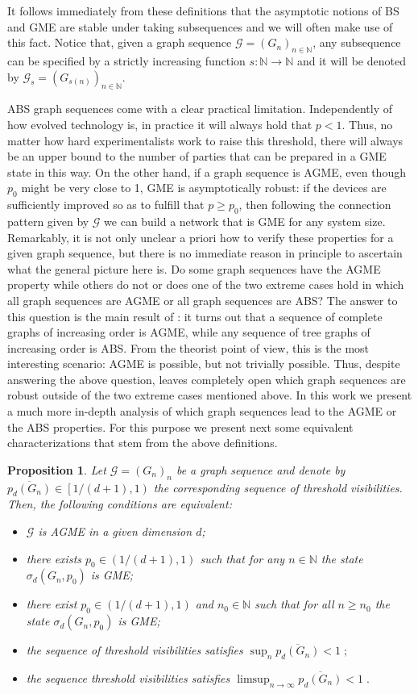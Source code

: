 \documentclass[a4paper,onecolumn,accepted=2024-12-14]{quantumarticle}
\newtheorem{proposition}[theorem]{Proposition}
\theoremstyle{plain}
\newcommand{\cG}{{\mathcal G}}         %
\newcommand{\N}{\mathbb{N}} %
\begin{document}
It follows immediately from these definitions that the asymptotic notions of BS and GME are stable under taking subsequences and we will often make use of this fact. Notice that, given a graph sequence $\cG=(G_n)_{n\in\N}$, any subsequence can be specified by a strictly increasing function $s\colon\N\to\N$ and it will be denoted by $\cG_s=(G_{s(n)})_{n\in\N}$.

ABS graph sequences come with a clear practical limitation. Independently of how evolved technology is, in practice it will always hold that $p<1$. Thus, no matter how hard experimentalists work to raise this threshold, there will always be an upper bound to the number of parties that can be prepared in a GME state in this way. On the other hand, if a graph sequence is AGME, even though $p_0$ might be very close to 1, GME is asymptotically robust: if the devices are sufficiently improved so as to fulfill that $p \geq p_0$, then following the connection pattern given by $\cG$ we can build a network that is GME for any system size. Remarkably, it is not only unclear a priori how to verify these properties for a given graph sequence, but there is no immediate reason in principle to ascertain what the general picture here is. Do some graph sequences have the AGME property while others do not or does one of the two extreme cases hold in which all graph sequences are AGME or all graph sequences are ABS? The answer to this question is the main result of \cite{ASGME}: it turns out that a sequence of complete graphs of increasing order is AGME, while any sequence of tree graphs of increasing order is ABS. From the theorist point of view, this is the most interesting scenario: AGME is possible, but not trivially possible. Thus, despite answering the above question, \cite{ASGME} leaves completely open which graph sequences are robust outside of the two extreme cases mentioned above. In this work we present a much more in-depth analysis of which graph sequences lead to the AGME or the ABS properties. For this purpose we present next some equivalent characterizations that stem from the above definitions.


\begin{proposition}\label{characterizationAGME}
Let $\cG=(G_n)_n$ be a graph sequence and denote by
$\overline{p_d(G_n)}\in\left[1/(d+1),1\right)$ the
corresponding sequence of threshold visibilities. Then, the following conditions are
equivalent:
\begin{itemize}
\item[(a)] $\cG$ is AGME in a given dimension $d$;
\item[(b)] there exists $p_0\in(1/(d+1),1)$ such that for any $n\in\N$ the state
$\sigma_d(G_n,p_0)$ is GME;
\item[(c)] there exist $ p_0\in(1/(d+1),1)$ and $ n_0\in\mathbb{N}$ such that
for all $n\geq n_0$ the state $\sigma_d(G_n,p_0)$ is GME;
\item[(d)] the sequence of threshold visibilities satisfies
$\sup_{n}\overline{p_d(G_n)}<1\;;$
\item[(e)] the sequence threshold visibilities satisfies
$\limsup_{n\to\infty}\overline{p_d(G_n)}<1\;.$
\end{itemize}
\end{proposition}
\end{document}
